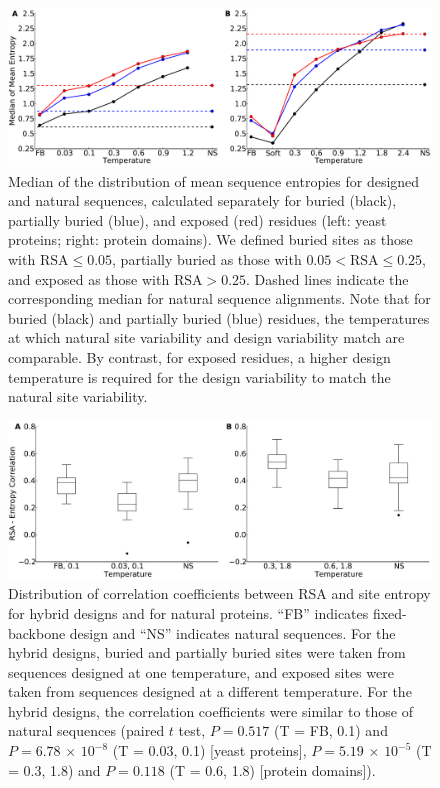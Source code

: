 \documentclass[12pt]{article}
\begin{document}
\begin{figure}[H]
\centerline{\includegraphics[width = 6in]{figures/Mean_Entropy_Position_Lineplot_Combo.pdf}}
\caption{Median of the distribution of mean sequence entropies for designed and natural sequences, calculated separately for buried (black), partially buried (blue), and exposed (red) residues (left: yeast proteins; right: protein domains). We defined buried sites as those with $\text{RSA}\leq 0.05$, partially buried as those with $0.05<\text{RSA}\leq0.25$, and exposed as those with $\text{RSA}>0.25$. Dashed lines indicate the corresponding median for natural sequence alignments. Note that for buried (black) and partially buried (blue) residues, the temperatures at which natural site variability and design variability match are comparable. By contrast, for exposed residues, a higher design temperature is required for the design variability to match the natural site variability.}
\label{Mean_Entropy_Surface_Core}
\end{figure}


\begin{figure}[H]
\centerline{\includegraphics[width = 6in]{figures/Combo_Mixed_Temp_Correlation_Plot.pdf}}
\caption{Distribution of correlation coefficients between RSA and site entropy for hybrid designs and for natural proteins. ``FB'' indicates fixed-backbone design and ``NS'' indicates natural sequences. For the hybrid designs, buried and partially buried sites were taken from sequences designed at one temperature, and exposed sites were taken from sequences designed at a different temperature. For the hybrid designs, the correlation coefficients were similar to those of natural sequences (paired $t$ test,  $P=0.517$ (T = FB, 0.1)  and  $P= 6.78 $ $\times$ $10^{-8}$ (T = 0.03, 0.1) [yeast proteins], $P= 5.19$  $\times$ $10^{-5}$ (T = 0.3, 1.8) and $P= 0.118$ (T = 0.6, 1.8)  [protein domains]).}
\label{Mixed_RSA_Entropy}
\end{figure}
\end{document}
